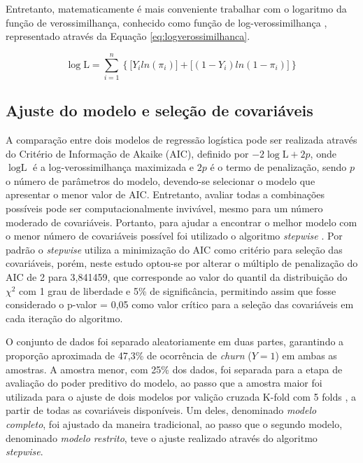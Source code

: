 \documentclass[twocolumn]{rbef}
\newcommand{\1}{\mathbbm{1}}
\begin{document}
Entretanto, matematicamente é mais conveniente trabalhar com o logaritmo da função de verossimilhança, conhecido como função de log-verossimilhança \cite{Favero2017,Botelho2010}, representado através da Equação \eqref{eq:logverossimilhanca}.

\begin{equation}
\log\text{L} = \sum_{i=1}^{n} \left\{ \big[Y_iln(\pi_i)\big] + \big[(1-Y_i)ln(1-\pi_i)\big] \right\}\label{eq:logverossimilhanca}
\end{equation}

\hypertarget{ajuste-do-modelo-e-seleuxe7uxe3o-de-covariuxe1veis}{%
\subsection{Ajuste do modelo e seleção de covariáveis}\label{ajuste-do-modelo-e-seleuxe7uxe3o-de-covariuxe1veis}}

A comparação entre dois modelos de regressão logística pode ser realizada através do Critério de Informação de Akaike (AIC), definido por \(-2\log\text{L} + 2p\), onde \(\log\text{L}\) é a log-verossimilhança maximizada e \(2p\) é o termo de penalização, sendo \(p\) o número de parâmetros do modelo, devendo-se selecionar o modelo que apresentar o menor valor de AIC. Entretanto, avaliar todas a combinações possíveis pode ser computacionalmente invivável, mesmo para um número moderado de covariáveis. Portanto, para ajudar a encontrar o melhor modelo com o menor número de covariáveis possível foi utilizado o algoritmo \textit{stepwise} \cite{Taconeli2019}. Por padrão o \textit{stepwise} utiliza a minimização do AIC como critério para seleção das covariáveis, porém, neste estudo optou-se por alterar o múltiplo de penalização do AIC de 2 para 3,841459, que corresponde ao valor do quantil da distribuição do \(\chi^2\) com 1 grau de liberdade e 5\% de significância, permitindo assim que fosse considerado o p-valor = 0,05 como valor crítico para a seleção das covariáveis em cada iteração do algoritmo.

O conjunto de dados foi separado aleatoriamente em duas partes, garantindo a proporção aproximada de 47,3\% de ocorrência de \textit{churn} (\(Y=1\)) em ambas as amostras. A amostra menor, com 25\% dos dados, foi separada para a etapa de avaliação do poder preditivo do modelo, ao passo que a amostra maior foi utilizada para o ajuste de dois modelos por valição cruzada K-fold com 5 folds \cite{Kohavi1995}, a partir de todas as covariáveis disponíveis. Um deles, denominado \textit{modelo completo}, foi ajustado da maneira tradicional, ao passo que o segundo modelo, denominado \textit{modelo restrito}, teve o ajuste realizado através do algoritmo \textit{stepwise}.
\end{document}
